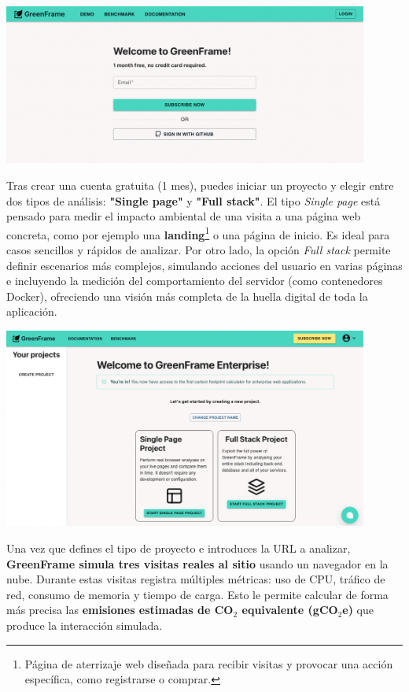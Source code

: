 \documentclass[12pt,a4paper]{report}
\begin{document}
\begin{center}
  \includegraphics[width=0.9\textwidth]{imagenes/Greenframe_1.png}
\end{center}

Tras crear una cuenta gratuita (1 mes), puedes iniciar un proyecto y elegir
entre dos tipos de análisis: \textbf{"Single page"} y \textbf{"Full stack"}. El
tipo \textit{Single page} está pensado para medir el impacto ambiental de una
visita a una página web concreta, como por ejemplo una
\textbf{landing}\footnote{Página de aterrizaje web diseñada para recibir
  visitas y provocar una acción específica, como registrarse o comprar.} o una
página de inicio. Es ideal para casos sencillos y rápidos de analizar. Por otro
lado, la opción \textit{Full stack} permite definir escenarios más complejos,
simulando acciones del usuario en varias páginas e incluyendo la medición del
comportamiento del servidor (como contenedores Docker), ofreciendo una visión
más completa de la huella digital de toda la aplicación.

\begin{center}
  \includegraphics[width=0.9\textwidth]{imagenes/Greenframe_2.png}
\end{center}

Una vez que defines el tipo de proyecto e introduces la URL a analizar,
\textbf{GreenFrame simula tres visitas reales al sitio} usando un navegador en
la nube. Durante estas visitas registra múltiples métricas: uso de CPU, tráfico
de red, consumo de memoria y tiempo de carga. Esto le permite calcular de forma
más precisa las \textbf{emisiones estimadas de CO$_2$ equivalente (gCO$_2$e)}
que produce la interacción simulada.
\end{document}
